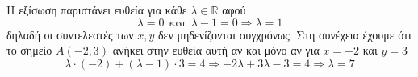 Η εξίσωση παριστάνει ευθεία για κάθε $ \lambda\in\mathbb{R} $ αφού
\[ \lambda=0\ \ \text{και}\ \ \lambda-1=0\Rightarrow\lambda=1 \]
δηλαδή οι συντελεστές των $ x,y $ δεν μηδενίζονται συγχρόνως. Στη συνέχεια έχουμε ότι το σημείο $ A(-2,3) $ ανήκει στην ευθεία αυτή αν και μόνο αν για $ x=-2 $ και $ y=3 $
\[ \lambda\cdot(-2)+(\lambda-1)\cdot 3=4\Rightarrow -2\lambda+3\lambda-3=4\Rightarrow \lambda=7 \]
